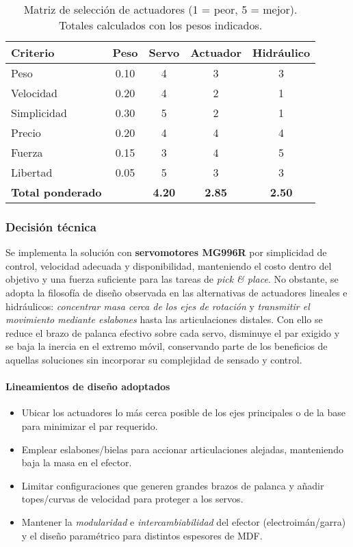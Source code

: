 \begin{table}[h!]
\centering
\begin{tabular}{l c c c c}
\toprule
\textbf{Criterio} & \textbf{Peso} & \textbf{Servo} & \textbf{Actuador} & \textbf{Hidráulico} \\
\midrule
Peso        & 0.10 & 4 & 3 & 3 \\
Velocidad   & 0.20 & 4 & 2 & 1 \\
Simplicidad & 0.30 & 5 & 2 & 1 \\
Precio      & 0.20 & 4 & 4 & 4 \\
Fuerza      & 0.15 & 3 & 4 & 5 \\
Libertad    & 0.05 & 5 & 3 & 3 \\
\midrule
\textbf{Total ponderado} &       & \textbf{4.20} & \textbf{2.85} & \textbf{2.50} \\
\bottomrule
\end{tabular}
\caption{Matriz de selección de actuadores (1 = peor, 5 = mejor). Totales calculados con los pesos indicados.}
\end{table}

\newpage

\subsubsection*{Decisión técnica}
Se implementa la solución con \textbf{servomotores MG996R} por simplicidad de control, velocidad adecuada y disponibilidad, manteniendo el costo dentro del objetivo y una fuerza suficiente para las tareas de \emph{pick \& place}. 
No obstante, se adopta la filosofía de diseño observada en las alternativas de actuadores lineales e hidráulicos: 
\emph{concentrar masa cerca de los ejes de rotación} y \emph{transmitir el movimiento mediante eslabones} hasta las articulaciones distales. 
Con ello se reduce el brazo de palanca efectivo sobre cada servo, disminuye el par exigido y se baja la inercia en el extremo móvil, 
conservando parte de los beneficios de aquellas soluciones sin incorporar su complejidad de sensado y control.

\paragraph{Lineamientos de diseño adoptados}
\begin{itemize}
  \item Ubicar los actuadores lo más cerca posible de los ejes principales o de la base para minimizar el par requerido.
  \item Emplear eslabones/bielas para accionar articulaciones alejadas, manteniendo baja la masa en el efector.
  \item Limitar configuraciones que generen grandes brazos de palanca y añadir topes/curvas de velocidad para proteger a los servos.
  \item Mantener la \emph{modularidad} e \emph{intercambiabilidad} del efector (electroimán/garra) y el diseño paramétrico para distintos espesores de MDF.\@
\end{itemize}

